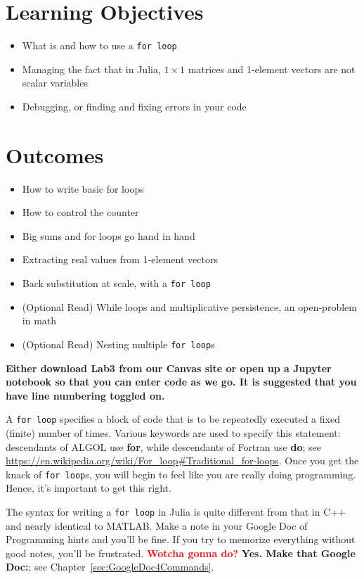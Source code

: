 
\section*{Learning Objectives}

\begin{itemize}
\item  What is and how to use a \texttt{for\,loop}
\item Managing the fact that in Julia, $1 \times 1$ matrices and 1-element vectors are not scalar variables
\item Debugging, or finding and fixing errors in your code
\end{itemize}

\section*{Outcomes} 
\begin{itemize}
\item How to write basic for loops
\item How to control the counter
\item Big sums and for loops go hand in hand
\item Extracting real values from 1-element vectors
\item Back substitution at scale, with a \texttt{for\,loop}
\item (Optional Read) While loops and multiplicative persistence, an open-problem in math
\item (Optional Read) Nesting multiple \texttt{for\,loop}s
\end{itemize}

\vspace*{1cm}

\textbf{Either download Lab3 from our Canvas site or open up a Jupyter notebook so that you can enter code as we go. It is suggested that you have line numbering toggled on.}  

\newpage

A \texttt{for\,loop} specifies a block of code that is to be repeatedly executed a fixed (finite) number of times. Various keywords are used to specify this statement: descendants of ALGOL use \textbf{for}, while descendants of Fortran use \textbf{do}; see \url{https://en.wikipedia.org/wiki/For_loop#Traditional_for-loops}. Once you get the knack of \texttt{for\,loop}s, you will begin to feel like you are really doing programming. Hence, it's important to get this right.

\begin{rem} The syntax for writing a \texttt{for\,loop} in Julia is quite different from that in C++ and nearly identical to MATLAB. Make a note in your Google Doc of Programming hints and you'll be fine. If you try to memorize everything without good notes, you'll be frustrated. \textcolor{red}{\bf Wotcha gonna do?}  \textbf{Yes. Make that Google Doc:}; see Chapter~\ref{sec:GoogleDoc4Commands}.  
\end{rem}

